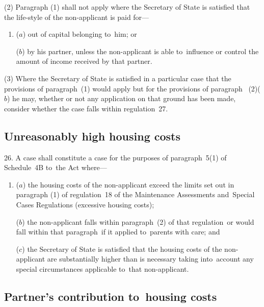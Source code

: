\documentclass[12pt,a4paper]{article}
\begin{document}
(2) Paragraph (1) shall not apply where the Secretary of State is satisfied that the life-style of the non-applicant is paid for—
\begin{enumerate}\item[]
($a$) out of capital belonging to~him; or

($b$) by his partner, unless the non-applicant is able to~influence or control the amount of income received by that partner.
\end{enumerate}

(3) Where the Secretary of State is satisfied in a particular case that the provisions of paragraph~(1) would apply but for the provisions of paragraph~%
(2)($b$)  %
he may, whether or not any application on that ground has been made, consider whether the case falls within regulation~27.


\subsection[26. Unreasonably high housing costs]{Unreasonably high housing costs}

26. A case shall constitute a case for the
purposes of paragraph~5(1) of Schedule~4B to~the Act where—
\begin{enumerate}\item[]
($a$) the housing costs of the non-applicant exceed the limits set out in paragraph
(1) of regulation~18 of the Maintenance Assessments and~Special Cases
Regulations (excessive housing costs);

($b$) the non-applicant falls within paragraph~(2) of that regulation~or would fall
within that paragraph~if it applied to~parents with care; and

($c$) the Secretary of State is satisfied that the housing costs of the
non-applicant are substantially higher than is necessary taking into~account any
special circumstances applicable to~that non-applicant.
\end{enumerate}

\subsection[27. Partner’s contribution to~housing costs]{Partner’s contribution to~housing costs}
\end{document}
